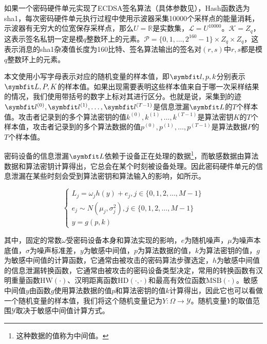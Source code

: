 {	\begin{example}
		如果一个密码硬件单元实现了ECDSA签名算法（具体参数见），Hash函数选为sha1\citep{FIPS180-4}，每次密码硬件单元执行过程中使用示波器采集10000个采样点的能量消耗，示波器有无穷大的位宽保存采样点，那么$U=\mathbb R$是实数集，$\mathcal L=U^{10000}$。$\mathcal K=Z_q$，这表示签名私钥一定是模$q$整数环上的元素。$\mathcal P=\{0,1,\dots,2^{160}-1\}\times Z_q\times Z_q$，这表示消息的sha1杂凑值长度为160比特、签名算法输出的签名对$(r,s)$中$r,s$都是模$q$整数环上的元素。
	\end{example}
	
	
	本文使用小写字母表示对应的随机变量的样本值，即$\Vector l,p,k$分别表示$\Vector L,P,K$的样本值。如果出现需要表明这些样本值来自于哪一次采样结果的情况，我们使用带括号的数字上标对其进行区分。也就是说，采集到的迹$\Vector {l^{(0)}}, \Vector {l^{(1)}}, \dots, \Vector {l^{(T-1)}}$是信息泄漏$\Vector L$的$T$个样本值。攻击者记录到的多个算法密钥的值$k^{(0)}, k^{(1)}, \dots, k^{(T-1)}$是算法密钥$K$的$T$个样本值，攻击者记录到的多个算法数据的值$p^{(0)}, p^{(1)}, \dots, p^{(T-1)}$是算法数据$P$的$T$个样本值。
	
	密码设备的信息泄漏$\Vector L$依赖于设备正在处理的数据\footnote{这种数据的值称为中间值。}，而敏感数据由算法数据和算法密钥计算得出，它总会在某个时刻被设备处理。因此密码硬件单元的信息泄漏在某些时刻会受到算法密钥和算法输入的影响，如所示。
	
	\begin{equation}
		\begin{cases}
			L_j=\omega_j h(y)+e_j,j\in\{0,1,2,\dots,M-1\}\\
			e_j\sim N(\mu_j,\sigma_j^2),j\in\{0,1,2,\dots,M-1\}\\
			y=g(p,k)
		\end{cases}\label{eq:leakagedetail}
	\end{equation}
	
	\noindent 其中，固定的常数$\omega$受密码设备本身和算法实现的影响，$e$为随机噪声，$\mu$为噪声本底值，$\sigma$为噪声标准差，$y$为敏感中间值，$p$为算法数据的值，$k$为算法密钥的值，$g$为敏感中间值的计算函数，它通常由被攻击的密码算法步骤选定，$h$为敏感中间值的信息泄漏转换函数，它通常由被攻击的密码设备类型决定，常用的转换函数有汉明重量函数$\mathrm {HW}(\cdot)$、汉明距离函数$\mathrm {HD}(\cdot,\cdot)$和最高有效位函数$\mathrm {MSB}(\cdot)$。敏感中间值$y$由函数$g$使用算法数据的值$p$和算法密钥的值$k$计算得出，因此它也可以看做一个随机变量的样本值，我们将这个随机变量记为$Y:\mathcal \Omega\rightarrow \mathcal Y$。随机变量$Y$的取值范围$\mathcal Y$取决于敏感中间值计算方式。
	
}
